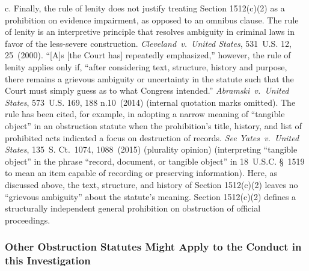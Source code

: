 c. Finally, the rule of lenity does not justify treating Section 1512(c)(2) as a prohibition on evidence impairment, as opposed to an omnibus clause.
The rule of lenity is an interpretive principle that resolves ambiguity in criminal laws in favor of the less-severe construction.
\textit{Cleveland~v.\ United States}, 531~U.S. 12, 25~(2000).
``[A]s [the Court has] repeatedly emphasized,'' however, the rule of lenity applies only if, ``after considering text, structure, history and purpose, there remains a grievous ambiguity or uncertainty in the statute such that the Court must simply guess as to what Congress intended.''
\textit{Abramski~v.\ United States}, 573~U.S. 169, 188 n.10~(2014) (internal quotation marks omitted).
The rule has been cited, for example, in adopting a narrow meaning of ``tangible object'' in an obstruction statute when the prohibition's title, history, and list of prohibited acts indicated a focus on destruction of records.
\textit{See Yates~v.\ United States}, 135~S. Ct.~1074, 1088~(2015) (plurality opinion) (interpreting ``tangible object'' in the phrase ``record, document, or tangible object'' in 18~U.S.C. \S~1519 to mean an item capable of recording or preserving information).
Here, as discussed above, the text, structure, and history of Section 1512(c)(2) leaves no ``grievous ambiguity'' about the statute's meaning.
Section 1512(c)(2) defines a structurally independent general prohibition on obstruction of official proceedings.

\subsubsection{Other Obstruction Statutes Might Apply to the Conduct in this Investigation}

